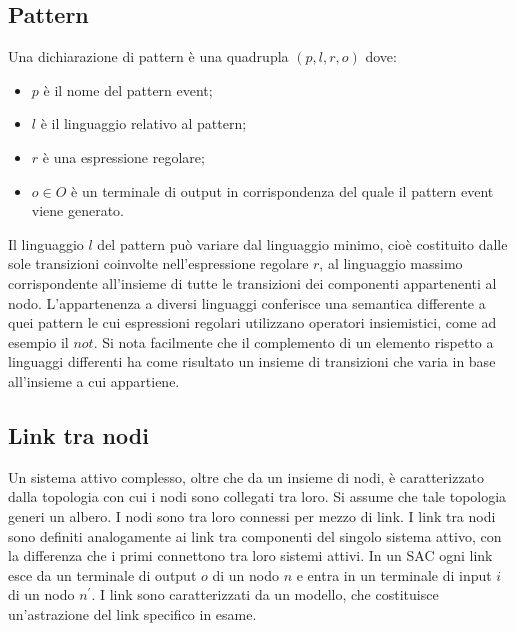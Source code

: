 \subsection{Pattern}
Una dichiarazione di pattern è una quadrupla $(p,l,r,o)$ dove:
\begin{itemize}
\item $p$ è il nome del pattern event;
\item $l$ è il linguaggio relativo al pattern;
\item $r$ è una espressione regolare;
\item $o \in O$ è un terminale di output in corrispondenza del quale il pattern event viene generato.
\end{itemize}
Il linguaggio $l$ del pattern può variare dal linguaggio minimo, cioè costituito dalle sole transizioni coinvolte nell'espressione regolare $r$, al linguaggio massimo corrispondente all'insieme di tutte le transizioni dei componenti appartenenti al nodo. L'appartenenza a diversi linguaggi conferisce una semantica differente a quei pattern le cui espressioni regolari utilizzano operatori insiemistici, come ad esempio il $not$. Si nota facilmente che il complemento di un elemento rispetto a linguaggi differenti ha come risultato un insieme di transizioni che varia in base all'insieme a cui appartiene.

\subsection{Link tra nodi}
Un sistema attivo complesso, oltre che da un insieme di nodi, è caratterizzato dalla topologia con cui i nodi sono collegati tra loro. Si assume che tale topologia generi un albero.
I nodi sono tra loro connessi per mezzo di link. I link tra nodi sono definiti analogamente ai link tra componenti del singolo sistema attivo, con la differenza che i primi connettono tra loro sistemi attivi.
In un SAC ogni link esce da un terminale di output $o$ di un nodo $n$ e entra in un terminale di input $i$ di un nodo $n^\prime$.
I link sono caratterizzati da un modello, che costituisce un'astrazione del link specifico in esame.

